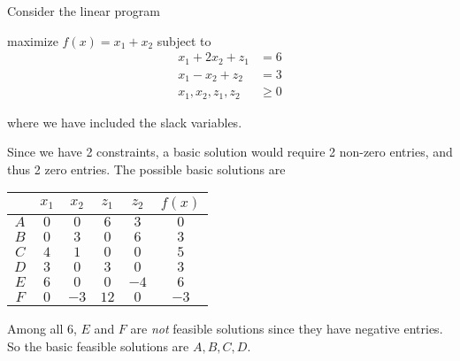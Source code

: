 \documentclass[a4paper]{article}
\begin{document}
\begin{eg}
  Consider the linear program
  \begin{center}
    maximize $f(x) = x_1 + x_2$ subject to
    \begin{align*}
      x_1 + 2x_2 + z_1&= 6\\
      x_1 - x_2 + z_2 &= 3\\
      x_1, x_2, z_1, z_2 &\geq 0
    \end{align*}
  \end{center}
  where we have included the slack variables.

  Since we have 2 constraints, a basic solution would require 2 non-zero entries, and thus 2 zero entries. The possible basic solutions are

  \begin{center}
    \begin{tabular}{cccccc}
      \toprule
      & $x_1$ & $x_2$ & $z_1$ & $z_2$ & $f(x)$\\
      \midrule
      $A$ & $0$ & $0$ & $6$ & $3$ & $0$\\
      $B$ & $0$ & $3$ & $0$ & $6$ & $3$\\
      $C$ & $4$ & $1$ & $0$ & $0$ & $5$\\
      $D$ & $3$ & $0$ & $3$ & $0$ & $3$\\
      $E$ & $6$ & $0$ & $0$ & $-4$ & $6$\\
      $F$ & $0$ & $-3$ & $12$ & $0$ & $-3$\\
      \bottomrule
    \end{tabular}
  \end{center}

  Among all 6, $E$ and $F$ are \emph{not} feasible solutions since they have negative entries. So the basic feasible solutions are $A, B, C, D$.

  \begin{center}
  \end{center}
\end{eg}
\end{document}

